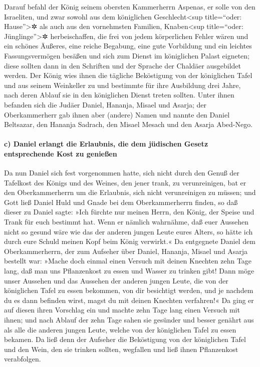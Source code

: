 Darauf befahl der König seinem obersten Kammerherrn
Aspenas, er solle von den Israeliten, und zwar sowohl aus dem
königlichen Geschlecht\textless sup title=``oder: Hause''\textgreater✲
als auch aus den vornehmsten Familien, Knaben\textless sup title=``oder:
Jünglinge''\textgreater✲ herbeischaffen, die frei von
jedem körperlichen Fehler wären und ein schönes Äußeres, eine reiche
Begabung, eine gute Vorbildung und ein leichtes Fassungsvermögen besäßen
und sich zum Dienst im königlichen Palast eigneten; diese sollten dann
in den Schriften und der Sprache der Chaldäer ausgebildet werden.
Der König wies ihnen die tägliche Beköstigung von der
königlichen Tafel und aus seinem Weinkeller zu und bestimmte für ihre
Ausbildung drei Jahre, nach deren Ablauf sie in den königlichen Dienst
treten sollten. Unter ihnen befanden sich die Judäer
Daniel, Hananja, Misael und Asarja; der Oberkammerherr gab
ihnen aber (andere) Namen und nannte den Daniel Beltsazar, den Hananja
Sadrach, den Misael Mesach und den Asarja Abed-Nego.

\hypertarget{c-daniel-erlangt-die-erlaubnis-die-dem-juxfcdischen-gesetz-entsprechende-kost-zu-genieuxdfen}{%
\paragraph{c) Daniel erlangt die Erlaubnis, die dem jüdischen Gesetz
entsprechende Kost zu
genießen}\label{c-daniel-erlangt-die-erlaubnis-die-dem-juxfcdischen-gesetz-entsprechende-kost-zu-genieuxdfen}}

Da nun Daniel sich fest vorgenommen hatte, sich nicht
durch den Genuß der Tafelkost des Königs und des Weines, den jener
trank, zu verunreinigen, bat er den Oberkammerherrn um die Erlaubnis,
sich nicht verunreinigen zu müssen; und Gott ließ Daniel
Huld und Gnade bei dem Oberkammerherrn finden, so daß
dieser zu Daniel sagte: »Ich fürchte nur meinen Herrn, den König, der
Speise und Trank für euch bestimmt hat. Wenn er nämlich wahrnähme, daß
euer Aussehen nicht so gesund wäre wie das der anderen jungen Leute
eures Alters, so hätte ich durch eure Schuld meinen Kopf beim König
verwirkt.« Da entgegnete Daniel dem Oberkammerherrn, der
zum Aufseher über Daniel, Hananja, Misael und Asarja bestellt war:
»Mache doch einmal einen Versuch mit deinen Knechten zehn
Tage lang, daß man uns Pflanzenkost zu essen und Wasser zu trinken gibt!
Dann möge unser Aussehen und das Aussehen der anderen
jungen Leute, die von der königlichen Tafel zu essen bekommen, von dir
besichtigt werden, und je nachdem du es dann befinden wirst, magst du
mit deinen Knechten verfahren!« Da ging er auf diesen
ihren Vorschlag ein und machte zehn Tage lang einen Versuch mit ihnen;
und nach Ablauf der zehn Tage sahen sie gesünder und
besser genährt aus als alle die anderen jungen Leute, welche von der
königlichen Tafel zu essen bekamen. Da ließ denn der
Aufseher die Beköstigung von der königlichen Tafel und den Wein, den sie
trinken sollten, wegfallen und ließ ihnen Pflanzenkost verabfolgen.

